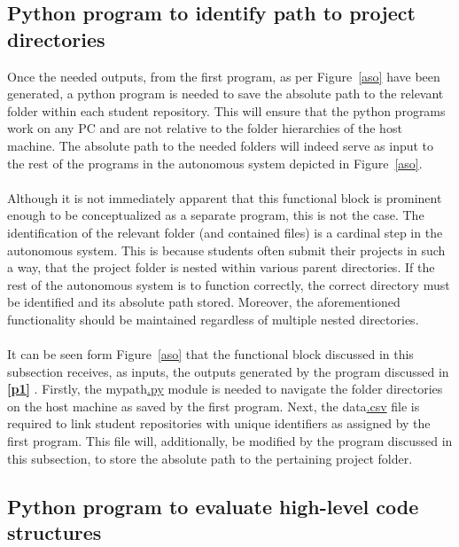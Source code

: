 \subsection{Python program to identify path to project directories}
\label{p2}
Once the needed outputs, from the first program, as per Figure~\ref{aso} have been generated, a python program is needed to save the absolute path to the relevant folder within each student repository. This will ensure that the python programs work on any PC and are not relative to the folder hierarchies of the host machine. The absolute path to the needed folders will indeed serve as input to the rest of the programs in the autonomous system depicted in Figure~\ref{aso}.
\\\\
Although it is not immediately apparent that this functional block is prominent enough to be conceptualized as a separate program, this is not the case. The identification of the relevant folder (and contained files) is a cardinal step in the autonomous system. This is because students often submit their projects in such a way, that the project folder is nested within various parent directories. If the rest of the autonomous system is to function correctly, the correct directory must be identified and its absolute path stored. Moreover, the aforementioned functionality should be maintained regardless of multiple nested directories.
\\\\
It can be seen form Figure~\ref{aso} that the functional block discussed in this subsection receives, as inputs, the outputs generated by the program discussed in \textbf{\ref{p1} }. Firstly, the mypath\hyperref[listExt]{.py} module is needed to navigate the folder directories on the host machine as saved by the first program. Next, the data\hyperref[listExt]{.csv} file is required to link student repositories with unique identifiers as assigned by the first program. This file will, additionally, be modified by the program discussed in this subsection, to store the absolute path to the pertaining project folder.  

\subsection{Python program to evaluate high-level code structures}
\label{p3}

